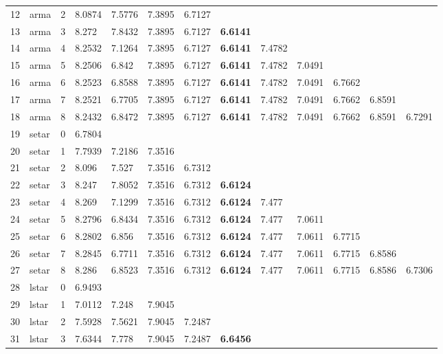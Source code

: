 \documentclass[10pt,a4paper]{article}
\begin{document}
\begin{table}[ht]
\begin{tabular}{rlrllllllllll}
  12 & arma &     2 & 8.0874 & 7.5776 & 7.3895 & 6.7127 &  &  &  &  &  &  \\ 
  13 & arma &     3 & 8.272 & 7.8432 & 7.3895 & 6.7127 & \textbf{6.6141} &  &  &  &  &  \\ 
  14 & arma &     4 & 8.2532 & 7.1264 & 7.3895 & 6.7127 & \textbf{6.6141} & 7.4782 &  &  &  &  \\ 
  15 & arma &     5 & 8.2506 & 6.842 & 7.3895 & 6.7127 & \textbf{6.6141} & 7.4782 & 7.0491 &  &  &  \\ 
  16 & arma &     6 & 8.2523 & 6.8588 & 7.3895 & 6.7127 & \textbf{6.6141} & 7.4782 & 7.0491 & 6.7662 &  &  \\ 
  17 & arma &     7 & 8.2521 & 6.7705 & 7.3895 & 6.7127 & \textbf{6.6141} & 7.4782 & 7.0491 & 6.7662 & 6.8591 &  \\ 
  18 & arma &     8 & 8.2432 & 6.8472 & 7.3895 & 6.7127 & \textbf{6.6141} & 7.4782 & 7.0491 & 6.7662 & 6.8591 & 6.7291 \\ 
   \hline
19 & setar &     0 & 6.7804 &  &  &  &  &  &  &  &  &  \\ 
  20 & setar &     1 & 7.7939 & 7.2186 & 7.3516 &  &  &  &  &  &  &  \\ 
  21 & setar &     2 & 8.096 & 7.527 & 7.3516 & 6.7312 &  &  &  &  &  &  \\ 
  22 & setar &     3 & 8.247 & 7.8052 & 7.3516 & 6.7312 & \textbf{6.6124} &  &  &  &  &  \\ 
  23 & setar &     4 & 8.269 & 7.1299 & 7.3516 & 6.7312 & \textbf{6.6124} & 7.477 &  &  &  &  \\ 
  24 & setar &     5 & 8.2796 & 6.8434 & 7.3516 & 6.7312 & \textbf{6.6124} & 7.477 & 7.0611 &  &  &  \\ 
  25 & setar &     6 & 8.2802 & 6.856 & 7.3516 & 6.7312 & \textbf{6.6124} & 7.477 & 7.0611 & 6.7715 &  &  \\ 
  26 & setar &     7 & 8.2845 & 6.7711 & 7.3516 & 6.7312 & \textbf{6.6124} & 7.477 & 7.0611 & 6.7715 & 6.8586 &  \\ 
  27 & setar &     8 & 8.286 & 6.8523 & 7.3516 & 6.7312 & \textbf{6.6124} & 7.477 & 7.0611 & 6.7715 & 6.8586 & 6.7306 \\ 
   \hline
28 & lstar &     0 & 6.9493 &  &  &  &  &  &  &  &  &  \\ 
  29 & lstar &     1 & 7.0112 & 7.248 & 7.9045 &  &  &  &  &  &  &  \\ 
  30 & lstar &     2 & 7.5928 & 7.5621 & 7.9045 & 7.2487 &  &  &  &  &  &  \\ 
  31 & lstar &     3 & 7.6344 & 7.778 & 7.9045 & 7.2487 & \textbf{6.6456} &  &  &  &  &  \\ 

\end{tabular}
\end{table}
\end{document}
